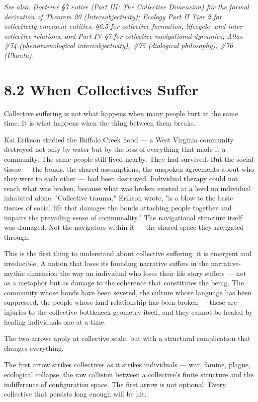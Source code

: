\textit{See also: Doctrine §7 entire (Part III: The Collective Dimension) for the formal derivation of Theorem 20 (Intersubjectivity); Ecology Part II Tier 2 for collectively-emergent entities, §6.5 for collective formation, lifecycle, and inter-collective relations, and Part IV §7 for collective navigational dynamics; Atlas \#74 (phenomenological intersubjectivity), \#75 (dialogical philosophy), \#76 (Ubuntu).}


\bigskip\noindent\makebox[\textwidth]{\color{rulegray}\rule{5cm}{0.3pt}}\bigskip


\section*{8.2 When Collectives Suffer}


Collective suffering is not what happens when many people hurt at the same time. It is what happens when the thing between them breaks.


Kai Erikson studied the Buffalo Creek flood — a West Virginia community destroyed not only by water but by the loss of everything that made it a community. The same people still lived nearby. They had survived. But the social tissue — the bonds, the shared assumptions, the unspoken agreements about who they were to each other — had been destroyed. Individual therapy could not reach what was broken, because what was broken existed at a level no individual inhabited alone. "Collective trauma," Erikson wrote, "is a blow to the basic tissues of social life that damages the bonds attaching people together and impairs the prevailing sense of communality." The navigational structure itself was damaged. Not the navigators within it — the shared space they navigated through.


This is the first thing to understand about collective suffering: it is emergent and irreducible. A nation that loses its founding narrative suffers in the narrative-mythic dimension the way an individual who loses their life story suffers — not as a metaphor but as damage to the coherence that constitutes the being. The community whose bonds have been severed, the culture whose language has been suppressed, the people whose land-relationship has been broken — these are injuries to the collective bottleneck geometry itself, and they cannot be healed by healing individuals one at a time.


The two arrows apply at collective scale, but with a structural complication that changes everything.


The first arrow strikes collectives as it strikes individuals — war, famine, plague, ecological collapse, the raw collision between a collective's finite structure and the indifference of configuration space. The first arrow is not optional. Every collective that persists long enough will be hit.


